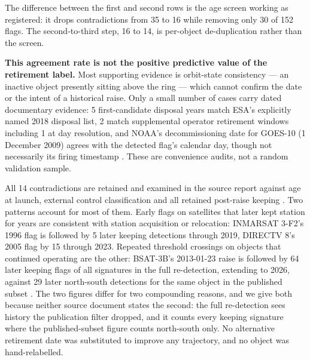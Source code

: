 \documentclass[11pt]{article}
\begin{document}

The difference between the first and second rows is the age screen working as registered: it drops contradictions from 35 to 16 while removing only 30 of 152 flags. The second-to-third step, 16 to 14, is per-object de-duplication rather than the screen.

\textbf{This agreement rate is not the positive predictive value of the retirement label.} Most supporting evidence is orbit-state consistency --- an inactive object presently sitting above the ring --- which cannot confirm the date or the intent of a historical raise. Only a small number of cases carry dated documentary evidence: 5 first-candidate disposal years match ESA's explicitly named 2018 disposal list, 2 match supplemental operator retirement windows including 1 at day resolution, and NOAA's decommissioning date for GOES-10 (1 December 2009) agrees with the detected flag's calendar day, though not necessarily its firing timestamp%
. These are convenience audits, not a random validation sample.

All 14 contradictions are retained and examined in the source report against age at launch, external control classification and all retained post-raise keeping%
. Two patterns account for most of them. Early flags on satellites that later kept station for years are consistent with station acquisition or relocation: INMARSAT 3-F2's 1996 flag is followed by 5 later keeping detections through 2019, DIRECTV 8's 2005 flag by 15 through 2023. Repeated threshold crossings on objects that continued operating are the other: BSAT-3B's 2013-01-23 raise is followed by 64 later keeping flags of all signatures in the full re-detection, extending to 2026, against 29 later north-south detections for the same object in the published subset%
. The two figures differ for two compounding reasons, and we give both because neither source document states the second: the full re-detection sees history the publication filter dropped, and it counts every keeping signature where the published-subset figure counts north-south only. No alternative retirement date was substituted to improve any trajectory, and no object was hand-relabelled.
\end{document}
